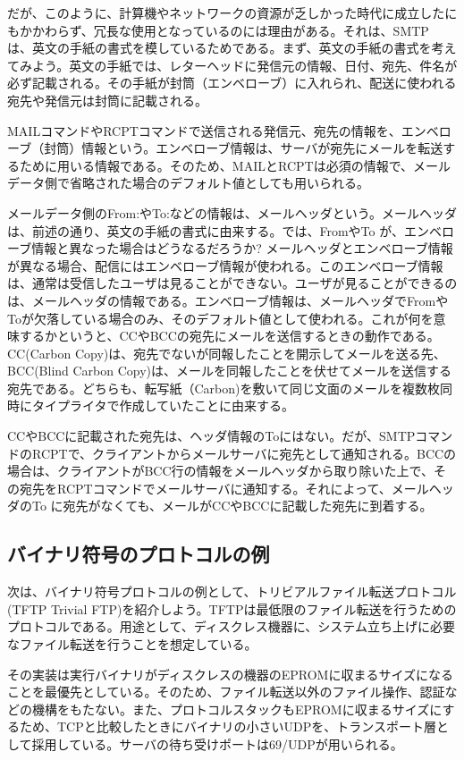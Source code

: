 だが、このように、計算機やネットワークの資源が乏しかった時代に成立したにもかかわらず、冗長な使用となっているのには理由がある。それは、SMTP は、英文の手紙の書式を模しているためである。まず、英文の手紙の書式を考えてみよう。英文の手紙では、レターヘッドに発信元の情報、日付、宛先、件名が必ず記載される。その手紙が封筒（エンベローブ）に入れられ、配送に使われる宛先や発信元は封筒に記載される。

MAILコマンドやRCPTコマンドで送信される発信元、宛先の情報を、エンベローブ（封筒）情報という。エンベローブ情報は、サーバが宛先にメールを転送するために用いる情報である。そのため、MAILとRCPTは必須の情報で、メールデータ側で省略された場合のデフォルト値としても用いられる。

メールデータ側のFrom:やTo:などの情報は、メールヘッダという。メールヘッダは、前述の通り、英文の手紙の書式に由来する。では、FromやTo が、エンベローブ情報と異なった場合はどうなるだろうか? メールヘッダとエンベローブ情報が異なる場合、配信にはエンベローブ情報が使われる。このエンベローブ情報は、通常は受信したユーザは見ることができない。ユーザが見ることができるのは、メールヘッダの情報である。エンベローブ情報は、メールヘッダでFromやToが欠落している場合のみ、そのデフォルト値として使われる。これが何を意味するかというと、CCやBCCの宛先にメールを送信するときの動作である。CC(Carbon Copy)は、宛先でないが同報したことを開示してメールを送る先、BCC(Blind Carbon Copy)は、メールを同報したことを伏せてメールを送信する宛先である。どちらも、転写紙（Carbon)を敷いて同じ文面のメールを複数枚同時にタイプライタで作成していたことに由来する。

CCやBCCに記載された宛先は、ヘッダ情報のToにはない。だが、SMTPコマンドのRCPTで、クライアントからメールサーバに宛先として通知される。BCCの場合は、クライアントがBCC行の情報をメールヘッダから取り除いた上で、その宛先をRCPTコマンドでメールサーバに通知する。それによって、メールヘッダのTo に宛先がなくても、メールがCCやBCCに記載した宛先に到着する。


\subsection{バイナリ符号のプロトコルの例}

次は、バイナリ符号プロトコルの例として、トリビアルファイル転送プロトコル(TFTP Trivial FTP)を紹介しよう。TFTPは最低限のファイル転送を行うためのプロトコルである。用途として、ディスクレス機器に、システム立ち上げに必要なファイル転送を行うことを想定している。

その実装は実行バイナリがディスクレスの機器のEPROMに収まるサイズになることを最優先としている。そのため、ファイル転送以外のファイル操作、認証などの機構をもたない。また、プロトコルスタックもEPROMに収まるサイズにするため、TCPと比較したときにバイナリの小さいUDPを、トランスポート層として採用している。サーバの待ち受けポートは69/UDPが用いられる。

